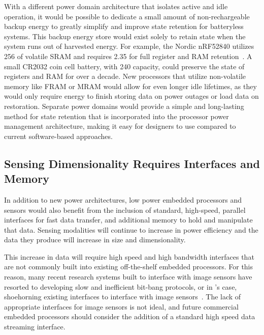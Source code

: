 With a different power domain architecture that isolates active and idle operation, it would be possible to dedicate a small amount of non-rechargeable backup energy to greatly simplify and improve state retention for batteryless systems.
This backup energy store would exist solely to retain state when the system runs out of harvested energy.
For example, the Nordic nRF52840 utilizes 256\ssi{\kilo\byte} of volatile SRAM and requires 2.35\ssi{\micro\watt} for full register and RAM retention~\cite{nrf52840}. 
A small CR2032 coin cell battery, with 240\ssi{\milli\Ah} capacity, could preserve the state of registers and RAM for over a decade.
New processors that utilize non-volatile memory like FRAM or MRAM would allow for even longer idle lifetimes, as they would only require energy to finish storing data on power outages or load data on restoration. 
Separate power domains would provide a simple and long-lasting method for state retention that is incorporated into the processor power management architecture, making it easy for designers to use compared to current software-based approaches. 

\subsection{Sensing Dimensionality Requires Interfaces and Memory}
In addition to new power architectures, low power embedded processors and sensors would also benefit from the inclusion of standard, high-speed, parallel interfaces for fast data transfer, and additional memory to hold and manipulate that data.
Sensing modalities will continue to increase in power efficiency and the data they produce will increase in size and dimensionality.

This increase in data will require high speed and high bandwidth interfaces that are not commonly built into existing off-the-shelf embedded processors.
For this reason, many recent research systems built to interface with image sensors have resorted to developing slow and inefficient bit-bang protocols, or in \namec{}'s case, shoehorning existing interfaces to interface with image sensors~\cite{josephson2019wireless, desai2022camaroptera}. 
The lack of appropriate interfaces for image sensors is not ideal, and future commercial embedded processors should consider the addition of a standard high speed data streaming interface. 

